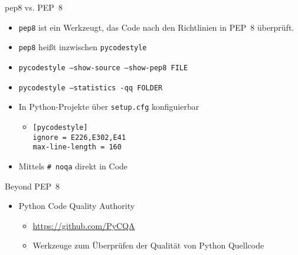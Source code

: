 \documentclass{beamer}
\begin{document}
\begin{frame}[fragile]{pep8 vs. PEP~8}
  \begin{itemize}
    \item \texttt{pep8} ist ein Werkzeugt, das Code nach den Richtlinien in PEP~8 überprüft.
    \item \texttt{pep8} heißt inzwischen \texttt{pycodestyle}
    \item \texttt{pycodestyle --show-source --show-pep8 FILE}
    \item \texttt{pycodestyle --statistics -qq FOLDER}
    \item In Python-Projekte über \texttt{setup.cfg} konfiguierbar
    \begin{itemize}
      \item
\begin{verbatim}
[pycodestyle]
ignore = E226,E302,E41
max-line-length = 160
\end{verbatim}
    \end{itemize}
    \item Mittels \texttt{# noqa} direkt in Code
  \end{itemize}
\end{frame}

\begin{frame}{Beyond PEP~8}
  \begin{itemize}
    \item Python Code Quality Authority
    \begin{itemize}
      \item \url{https://github.com/PyCQA}
      \item Werkzeuge zum Überprüfen der Qualität von Python Quellcode
    \end{itemize}
  \end{itemize}
\end{frame}
\end{document}
